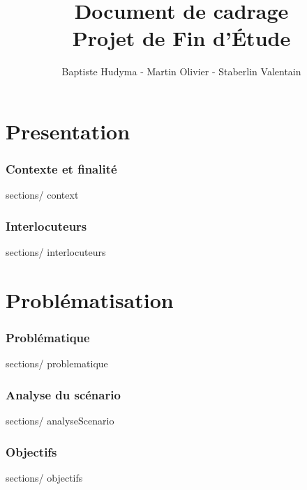 \documentclass[french, 11pt, a4paper]{article}
\begin{document}
\title {Document de cadrage\\Projet de Fin d'Étude}
\author{Baptiste Hudyma - Martin Olivier - Staberlin Valentain}

\thispagestyle {plain}

\maketitle
\newpage

\tableofcontents
\newpage



\part {Presentation}
\section {Contexte et finalité}
 {sections/} {context}

\section {Interlocuteurs}
 {sections/} {interlocuteurs}



\newpage
\part {Problématisation}

\section {Problématique}
 {sections/} {problematique}

\section {Analyse du scénario}
 {sections/} {analyseScenario}

\section {Objectifs}
 {sections/} {objectifs}
\end{document}

